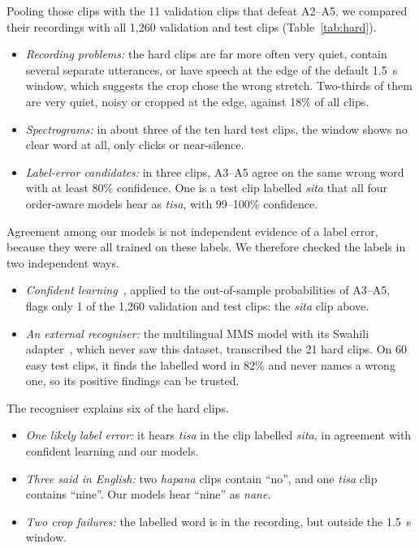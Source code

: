Pooling those clips with the 11 validation clips that defeat A2--A5, we compared their recordings with all 1,260
validation and test clips (Table~\ref{tab:hard}).
\begin{itemize}
  \item \emph{Recording problems:} the hard clips are far more often very quiet, contain several separate
        utterances, or have speech at the edge of the default 1.5~s window, which suggests the crop chose the wrong
        stretch. Two-thirds of them are very quiet, noisy or cropped at the edge, against 18\% of all clips.
  \item \emph{Spectrograms:} in about three of the ten hard test clips, the window shows no clear word at all, only
        clicks or near-silence.
  \item \emph{Label-error candidates:} in three clips, A3--A5 agree on the same wrong word with at least 80\%
        confidence. One is a test clip labelled \textit{sita} that all four order-aware models hear as
        \textit{tisa}, with 99--100\% confidence.
\end{itemize}
Agreement among our models is not independent evidence of a label error, because they were all trained on these
labels. We therefore checked the labels in two independent ways.
\begin{itemize}
  \item \emph{Confident learning}~\cite{northcutt2021confident}, applied to the out-of-sample probabilities of A3--A5,
        flags only 1 of the 1,260 validation and test clips: the \textit{sita} clip above.
  \item \emph{An external recogniser:} the multilingual MMS model with its Swahili adapter~\cite{pratap2024scaling},
        which never saw this dataset, transcribed the 21 hard clips. On 60 easy test clips, it finds the labelled
        word in 82\% and never names a wrong one, so its positive findings can be trusted.
\end{itemize}
The recogniser explains six of the hard clips.
\begin{itemize}
  \item \emph{One likely label error:} it hears \textit{tisa} in the clip labelled \textit{sita}, in agreement with
        confident learning and our models.
  \item \emph{Three said in English:} two \textit{hapana} clips contain ``no'', and one \textit{tisa} clip contains
        ``nine''. Our models hear ``nine'' as \textit{nane}.
  \item \emph{Two crop failures:} the labelled word is in the recording, but outside the 1.5~s window.
\end{itemize}

